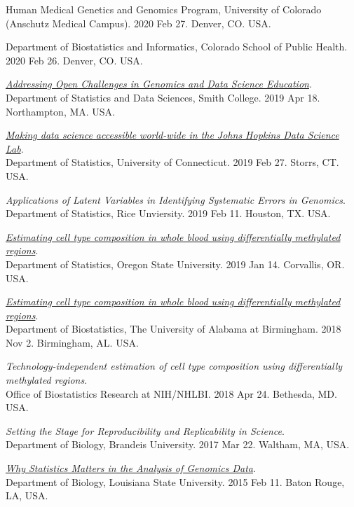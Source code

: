 \documentclass[10pt]{article}
\begin{document}
\item 
Human Medical Genetics and Genomics Program, University of Colorado (Anschutz Medical Campus). 2020 Feb 27. Denver, CO. USA.
\item 
Department of Biostatistics and Informatics, Colorado School of Public Health. 2020 Feb 26. Denver, CO. USA.
\item 
{\it \href{https://speakerdeck.com/stephaniehicks/addressing-open-challenges-in-data-science-education}{Addressing Open Challenges in Genomics and Data Science Education}}. \\ 
Department of Statistics and Data Sciences, Smith College. 2019 Apr 18. Northampton, MA. USA.
\item 
{\it \href{https://speakerdeck.com/stephaniehicks/making-data-science-accessible-in-the-johns-hopkins-data-science-lab}{Making data science accessible world-wide in the Johns Hopkins Data Science Lab}}. \\ 
Department of Statistics, University of Connecticut. 2019 Feb 27. Storrs, CT. USA.
\item 
{\it Applications of Latent Variables in Identifying Systematic Errors in Genomics}. \\
Department of Statistics, Rice Unviersity. 2019 Feb 11. Houston, TX. USA.
\item 
{\it \href{https://speakerdeck.com/stephaniehicks/methylcc-presentation}{Estimating cell type composition in whole blood using differentially methylated regions}}. \\
Department of Statistics, Oregon State University. 2019 Jan 14. Corvallis, OR. USA.
\item 
{\it \href{https://speakerdeck.com/stephaniehicks/methylcc-presentation}{Estimating cell type composition in whole blood using differentially methylated regions}}. \\
Department of Biostatistics, The University of Alabama at Birmingham. 2018 Nov 2. Birmingham, AL. USA.
\item 
{\it Technology-independent estimation of cell type composition using differentially methylated regions}. \\
Office of Biostatistics Research at NIH/NHLBI. 2018 Apr 24. Bethesda, MD. USA.
\item 
{\it Setting the Stage for Reproducibility and Replicability in Science}. \\
Department of Biology, Brandeis University. 2017 Mar 22. Waltham, MA, USA.
\item 
{\it \href{https://speakerdeck.com/stephaniehicks/why-statistics-matters-in-the-analysis-of-genomics-data}{Why Statistics Matters in the Analysis of Genomics Data}}. \\ 
Department of Biology, Louisiana State University. 2015 Feb 11. Baton Rouge, LA, USA.
\end{document}
